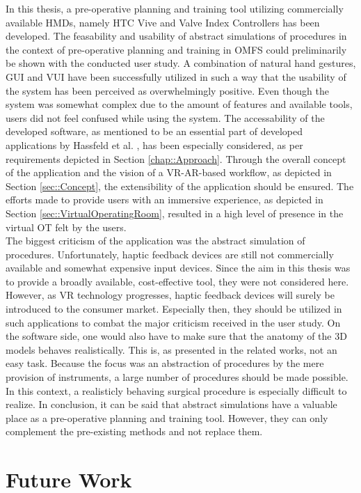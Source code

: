 In this thesis, a pre-operative planning and training tool utilizing
commercially available HMDs, namely HTC Vive and Valve Index Controllers
has been developed. The feasability and usability of 
abstract simulations of procedures in the context of pre-operative planning
and training in OMFS could preliminarily be shown with the conducted user study.
A combination of natural hand gestures, GUI and VUI have been
successfully utilized in such a way that the usability
of the system has been perceived as overwhelmingly positive.
Even though the system was somewhat complex due to the amount of features 
and available tools, users did not feel confused while using the system.
The accessability of the developed software, 
as mentioned to be an essential part of developed applications by
Hassfeld et al. \cite{HASSFELD20012}, has been especially considered,
as per requirements depicted in Section \ref{chap::Approach}.
Through the overall concept of the application and the vision of a VR-AR-based workflow, as depicted in Section 
\ref{sec::Concept}, the extensibility of the application should be ensured. 
The efforts made to provide users with an immersive experience,
as depicted in Section \ref{sec::VirtualOperatingRoom},
resulted in a high level of presence in the virtual OT felt by the users.
\\ The biggest criticism of the application was the abstract 
simulation of procedures. Unfortunately, haptic feedback devices are still
not commercially available and somewhat expensive input devices. Since
the aim in this thesis was to provide a broadly available, cost-effective
tool, they were not considered here. However, as VR technology progresses,
haptic feedback devices will surely be introduced to the consumer market.
Especially then, they should be utilized in such applications to combat
the major criticism received in the user study.
On the software side, one would also have to make sure that 
the anatomy of the 3D models behaves realistically. This is, as 
presented in the related works, not an easy task. 
Because the focus was an abstraction of procedures by the mere provision 
of instruments, a large number of procedures should be made possible.
In this context, a realisticly behaving surgical procedure is
especially difficult to realize.
In conclusion, it can be said that abstract simulations have a valuable
place as a pre-operative planning and training tool. However, they 
can only complement the pre-existing methods and not replace them.
 
\section{Future Work}






